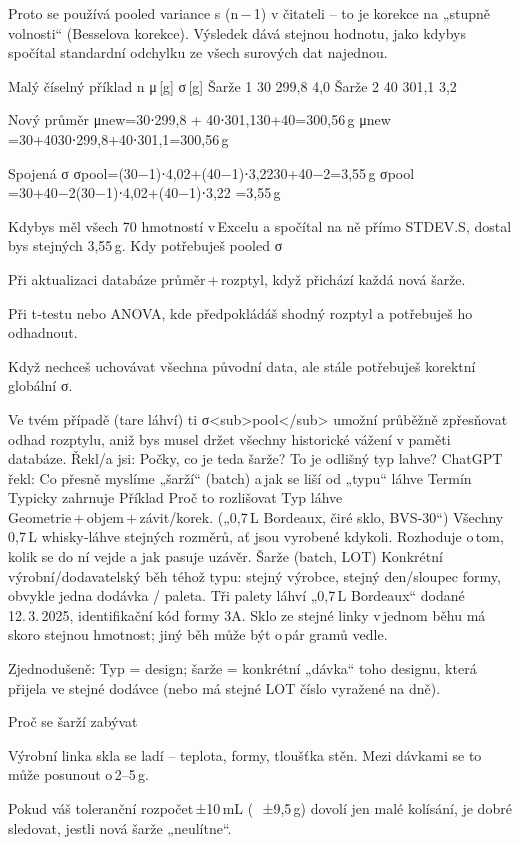         Proto se používá pooled variance s (n − 1) v čitateli – to je korekce na „stupně volnosti“ (Besselova korekce). Výsledek dává stejnou hodnotu, jako kdybys spočítal standardní odchylku ze všech surových dat najednou.

Malý číselný příklad
	n	μ [g]	σ [g]
Šarže 1	30	299,8	4,0
Šarže 2	40	301,1	3,2

Nový průměr
μnew=30⋅299,8  +  40⋅301,130+40=300,56 g
μnew​=30+4030⋅299,8+40⋅301,1​=300,56 g

Spojená σ
σpool=(30−1)⋅4,02+(40−1)⋅3,2230+40−2=3,55 g
σpool​=30+40−2(30−1)⋅4,02+(40−1)⋅3,22​
​=3,55 g

Kdybys měl všech 70 hmotností v Excelu a spočítal na ně přímo STDEV.S, dostal bys stejných 3,55 g.
Kdy potřebuješ pooled σ

    Při aktualizaci databáze průměr + rozptyl, když přichází každá nová šarže.

    Při t‑testu nebo ANOVA, kde předpokládáš shodný rozptyl a potřebuješ ho odhadnout.

    Když nechceš uchovávat všechna původní data, ale stále potřebuješ korektní globální σ.

Ve tvém případě (tare láhví) ti σ<sub>pool</sub> umožní průběžně zpřesňovat odhad rozptylu, aniž bys musel držet všechny historické vážení v paměti databáze.
Řekl/a jsi:
Počky, co je teda šarže? To je odlišný typ lahve?
ChatGPT řekl:
Co přesně myslíme „šarží“ (batch) a jak se liší od „typu“ láhve
Termín	Typicky zahrnuje	Příklad	Proč to rozlišovat
Typ láhve	Geometrie + objem + závit/korek.
(„0,7 L Bordeaux, čiré sklo, BVS‑30“)	Všechny 0,7 L whisky‑láhve stejných rozměrů, ať jsou vyrobené kdykoli.	Rozhoduje o tom, kolik se do ní vejde a jak pasuje uzávěr.
Šarže (batch, LOT)	Konkrétní výrobní/dodavatelský běh téhož typu: stejný výrobce, stejný den/sloupec formy, obvykle jedna dodávka / paleta.	Tři palety láhví „0,7 L Bordeaux“ dodané 12. 3. 2025, identifikační kód formy 3A.	Sklo ze stejné linky v jednom běhu má skoro stejnou hmotnost; jiný běh může být o pár gramů vedle.

    Zjednodušeně:
    Typ = design; šarže = konkrétní „dávka“ toho designu, která přijela ve stejné dodávce (nebo má stejné LOT číslo vyražené na dně).

Proč se šarží zabývat

    Výrobní linka skla se ladí – teplota, formy, tloušťka stěn. Mezi dávkami se to může posunout o 2–5 g.

    Pokud váš toleranční rozpočet ±10 mL (~ ±9,5 g) dovolí jen malé kolísání, je dobré sledovat, jestli nová šarže „neulítne“.

